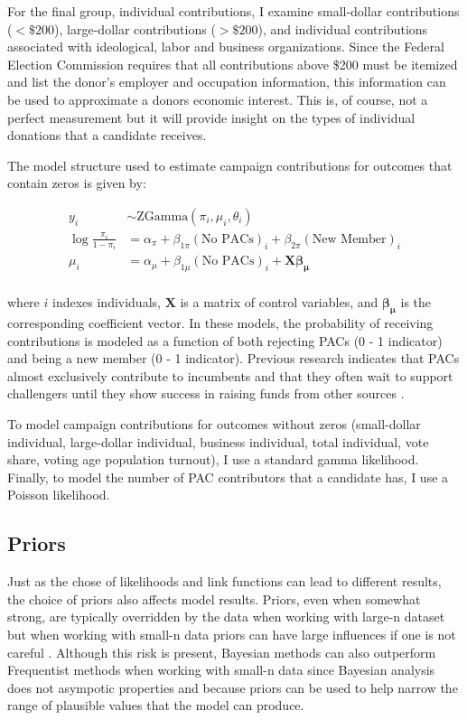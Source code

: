 \documentclass[12pt]{article}
\begin{document}
For the final group, individual contributions, I examine small-dollar contributions ($< \$200$), large-dollar contributions ($> \$200$), and individual contributions associated with ideological, labor and business organizations. Since the Federal Election Commission requires that all contributions above \$200 must be itemized and list the donor's employer and occupation information, this information can be used to approximate a donors economic interest. This is, of course, not a perfect measurement but it will provide insight on the types of individual donations that a candidate receives. 

The model structure used to estimate campaign contributions for outcomes that contain zeros is given by: 

$$
\begin{aligned}
	y_i &\sim \text{ZGamma}(\pi_i, \mu_i, \theta_i) \\
	\log \frac{\pi_i}{1 - \pi_i} &= \alpha_{\pi} + \beta_{1\pi} (\text{No PACs})_i + \beta_{2\pi} (\text{New Member})_i \\
	\mu_i &= \alpha_{\mu} + \beta_{1\mu} (\text{No PACs})_i + \bm{X} \bm{\beta_{\mu}} \\
\end{aligned}
$$

\noindent where $i$ indexes individuals, $\bm{X}$ is a matrix of control variables, and $\bm{\beta_{\mu}}$ is the corresponding coefficient vector. In these models, the probability of receiving contributions is modeled as a function of both rejecting PACs (0 - 1 indicator) and being a new member (0 - 1 indicator). Previous research indicates that PACs almost exclusively contribute to incumbents \citep{brunell_relationship_2005} and that they often wait to support challengers until they show success in raising funds from other sources \citep{biersack_seeds_1993}. 

To model campaign contributions for outcomes without zeros (small-dollar individual, large-dollar individual, business individual, total individual, vote share, voting age population turnout), I use a standard gamma likelihood. Finally, to model the number of PAC contributors that a candidate has, I use a Poisson likelihood. 

\subsection{Priors}

Just as the chose of likelihoods and link functions can lead to different results, the choice of priors also affects model results. Priors, even when somewhat strong, are typically overridden by the data when working with large-n dataset but when working with small-n data priors can have large influences if one is not careful \citep{mcneish_using_2016}. Although this risk is present, Bayesian methods can also outperform Frequentist methods when working with small-n data since Bayesian analysis does not asympotic properties and because priors can be used to help narrow the range of plausible values that the model can produce. 
\end{document}

